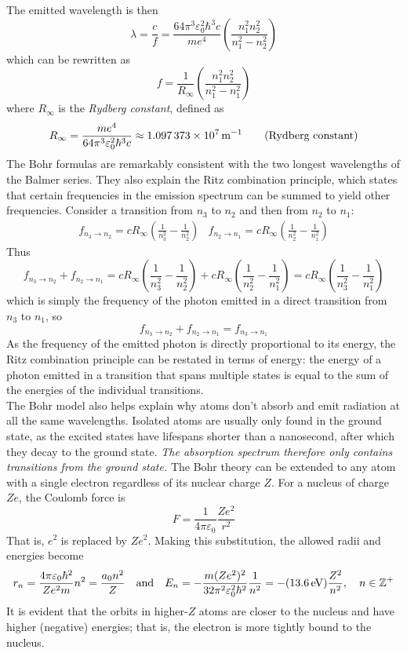 \documentclass{subfiles}
\begin{document}
				The emitted wavelength is then
				\[
					\lambda = \frac{c}{f}
						= \frac{64\pi^3\varepsilon_0^2\hbar^3c}{me^4}\left(\frac{n_1^2n_2^2}{n_1^2 - n_2^2}\right)
				\]
				which can be rewritten as
				\[f = \frac{1}{R_\infty}\left(\frac{n_1^2n_2^2}{n_1^2 - n_1^2}\right)\]
				where \(R_\infty\) is the \textit{Rydberg constant}, defined as
				\[
					R_\infty = \frac{me^4}{64\pi^3\varepsilon_0^2\hbar^3c}
						\approx \SI{1.097373E7}{m^{-1}}
						\tag{Rydberg constant}
				\]
			The Bohr formulas are remarkably consistent with the two longest wavelengths of the Balmer series. They also explain the Ritz combination principle, which states that certain frequencies in the emission spectrum can be summed to yield other frequencies. Consider a transition from \(n_3\) to \(n_2\) and then from \(n_2\) to \(n_1\):
				\begin{align*}
					f_{n_3 \to n_2} = cR_\infty\left(\frac{1}{n_3^2} - \frac{1}{n_2^2}\right) &
						f_{n_2 \to n_1} = cR_\infty\left(\frac{1}{n_2^2} - \frac{1}{n_1^2}\right)
				\end{align*}
				Thus
				\[
					f_{n_3 \to n_2} + f_{n_2 \to n_1} = cR_\infty\left(\frac{1}{n_3^2} - \frac{1}{n_2^2}\right) + cR_\infty\left(\frac{1}{n_2^2} - \frac{1}{n_1^2}\right)
						= cR_\infty\left(\frac{1}{n_3^2} - \frac{1}{n_1^2}\right)
				\]			
				which is simply the frequency of the photon emitted in a direct transition from \(n_3\) to \(n_1\), so
				\[
					f_{n_3 \to n_2} + f_{n_2 \to n_1} = f_{n_3 \to n_1}
						\tag{Ritz transition principle}
				\]
				As the frequency of the emitted photon is directly proportional to its energy, the Ritz combination principle can be restated in terms of energy: the energy of a photon emitted in a transition that spans multiple states is equal to the sum of the energies of the individual transitions. \\
			The Bohr model also helps explain why atoms don't absorb and emit radiation at all the same wavelengths. Isolated atoms are usually only found in the ground state, as the excited states have lifespans shorter than a nanosecond, after which they decay to the ground state. \textit{The absorption spectrum therefore only contains transitions from the ground state.}
			The Bohr theory can be extended to any atom with a single electron regardless of its nuclear charge \(Z\). For a nucleus of charge \(Ze\), the Coulomb force is
				\[F = \frac{1}{4\pi\varepsilon_0}\frac{Ze^2}{r^2}\]
				That is, \(e^2\) is replaced by \(Ze^2\). Making this substitution, the allowed radii and energies become
				\[
					r_n = \frac{4\pi\varepsilon_0\hbar^2}{Ze^2m}n^2
						= \frac{a_0n^2}{Z} \quad \text{and} \quad
						E_n = -\frac{m(Ze^2)^2}{32\pi^2\varepsilon_0^2\hbar^2}\frac{1}{n^2}
							= -(\SI{13.6}{eV})\frac{Z^2}{n^2}
							, \quad n \in \mathbb{Z}^+
				\]
				It is evident that the orbits in higher-\(Z\) atoms are closer to the nucleus and have higher (negative) energies; that is, the electron is more tightly bound to the nucleus.
\end{document}
